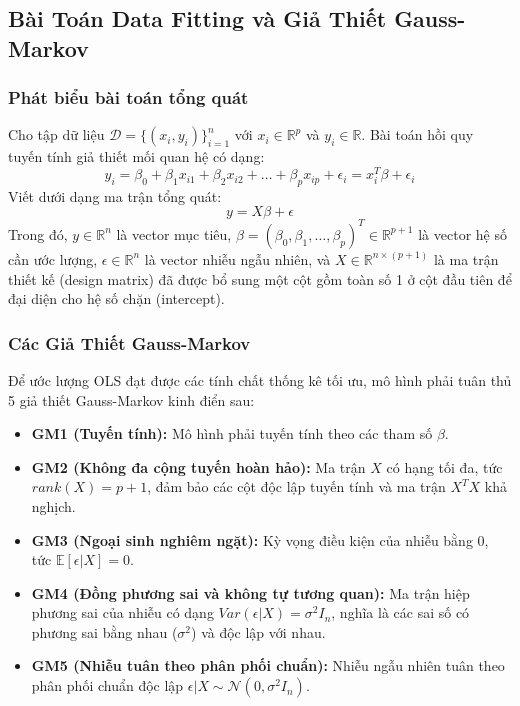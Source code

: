 \documentclass[12pt,a4paper]{article}
\begin{document}
\subsection{Bài Toán Data Fitting và Giả Thiết Gauss-Markov}

\subsubsection{Phát biểu bài toán tổng quát}
Cho tập dữ liệu $\mathcal{D}=\{(x_{i},y_{i})\}_{i=1}^{n}$ với $x_{i}\in\mathbb{R}^{p}$ và $y_{i}\in\mathbb{R}$. Bài toán hồi quy tuyến tính giả thiết mối quan hệ có dạng:
\begin{equation}
    y_{i} = \beta_{0} + \beta_{1}x_{i1} + \beta_{2}x_{i2} + \dots + \beta_{p}x_{ip} + \epsilon_{i} = x_{i}^{T}\beta + \epsilon_{i}
\end{equation}
Viết dưới dạng ma trận tổng quát:
\begin{equation}
    y = X\beta + \epsilon
\end{equation}
Trong đó, $y \in \mathbb{R}^{n}$ là vector mục tiêu, $\beta = (\beta_{0}, \beta_{1}, \dots, \beta_{p})^{T} \in \mathbb{R}^{p+1}$ là vector hệ số cần ước lượng, $\epsilon \in \mathbb{R}^{n}$ là vector nhiễu ngẫu nhiên, và $X \in \mathbb{R}^{n \times (p+1)}$ là ma trận thiết kế (design matrix) đã được bổ sung một cột gồm toàn số 1 ở cột đầu tiên để đại diện cho hệ số chặn (intercept).

\subsubsection{Các Giả Thiết Gauss-Markov}
Để ước lượng OLS đạt được các tính chất thống kê tối ưu, mô hình phải tuân thủ 5 giả thiết Gauss-Markov kinh điển sau:
\begin{itemize}
    \item \textbf{GM1 (Tuyến tính):} Mô hình phải tuyến tính theo các tham số $\beta$.
    \item \textbf{GM2 (Không đa cộng tuyến hoàn hảo):} Ma trận $X$ có hạng tối đa, tức $rank(X) = p + 1$, đảm bảo các cột độc lập tuyến tính và ma trận $X^TX$ khả nghịch.
    \item \textbf{GM3 (Ngoại sinh nghiêm ngặt):} Kỳ vọng điều kiện của nhiễu bằng 0, tức $\mathbb{E}[\epsilon|X] = 0$.
    \item \textbf{GM4 (Đồng phương sai và không tự tương quan):} Ma trận hiệp phương sai của nhiễu có dạng $Var(\epsilon|X) = \sigma^2 I_n$, nghĩa là các sai số có phương sai bằng nhau ($\sigma^2$) và độc lập với nhau.
    \item \textbf{GM5 (Nhiễu tuân theo phân phối chuẩn):} Nhiễu ngẫu nhiên tuân theo phân phối chuẩn độc lập $\epsilon | X \sim \mathcal{N}(0, \sigma^2 I_n)$.
\end{itemize}
\end{document}

